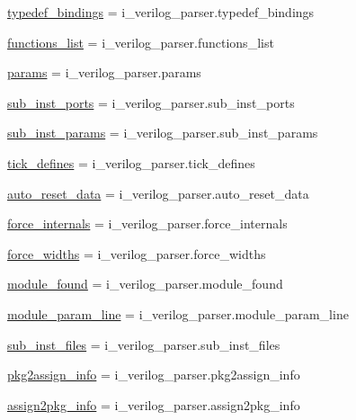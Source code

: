 \begin{DoxyCompactItemize}
\item 
\hyperlink{namespaceveripy_a680f37dc5088c673d909d0871aa4d9a1}{typedef\-\_\-bindings} = i\-\_\-verilog\-\_\-parser.\-typedef\-\_\-bindings
\item 
\hyperlink{namespaceveripy_a2c9a3299c6e29cd2d14411235ab6e41c}{functions\-\_\-list} = i\-\_\-verilog\-\_\-parser.\-functions\-\_\-list
\item 
\hyperlink{namespaceveripy_ab652869357ad8a97cd180a20659d3647}{params} = i\-\_\-verilog\-\_\-parser.\-params
\item 
\hyperlink{namespaceveripy_a2b7f6e748a1166c9272af6cc49f384bb}{sub\-\_\-inst\-\_\-ports} = i\-\_\-verilog\-\_\-parser.\-sub\-\_\-inst\-\_\-ports
\item 
\hyperlink{namespaceveripy_a3d4e4d7b77fb2b4b84c418a101755e7c}{sub\-\_\-inst\-\_\-params} = i\-\_\-verilog\-\_\-parser.\-sub\-\_\-inst\-\_\-params
\item 
\hyperlink{namespaceveripy_aaa9e0a3d2b05e047d295ee78848b3a89}{tick\-\_\-defines} = i\-\_\-verilog\-\_\-parser.\-tick\-\_\-defines
\item 
\hyperlink{namespaceveripy_aed29c63170d881d76a0845d94c3d6bdd}{auto\-\_\-reset\-\_\-data} = i\-\_\-verilog\-\_\-parser.\-auto\-\_\-reset\-\_\-data
\item 
\hyperlink{namespaceveripy_aa1d344d5e238d367dcaf3acb91dbcc6d}{force\-\_\-internals} = i\-\_\-verilog\-\_\-parser.\-force\-\_\-internals
\item 
\hyperlink{namespaceveripy_a807b041df84d51d3d521d3bef8fd0caa}{force\-\_\-widths} = i\-\_\-verilog\-\_\-parser.\-force\-\_\-widths
\item 
\hyperlink{namespaceveripy_a99c42ac13d96eb9d80f354e2a1e05c56}{module\-\_\-found} = i\-\_\-verilog\-\_\-parser.\-module\-\_\-found
\item 
\hyperlink{namespaceveripy_ad28afa9505ad0efeb718337fc56e525b}{module\-\_\-param\-\_\-line} = i\-\_\-verilog\-\_\-parser.\-module\-\_\-param\-\_\-line
\item 
\hyperlink{namespaceveripy_a0adf40cf6c1ebe154b70e8dc46889228}{sub\-\_\-inst\-\_\-files} = i\-\_\-verilog\-\_\-parser.\-sub\-\_\-inst\-\_\-files
\item 
\hyperlink{namespaceveripy_abb8af7474ba6f1fe4499f0baf5e6c9da}{pkg2assign\-\_\-info} = i\-\_\-verilog\-\_\-parser.\-pkg2assign\-\_\-info
\item 
\hyperlink{namespaceveripy_a95394440df7568c06df836060d2c1f5e}{assign2pkg\-\_\-info} = i\-\_\-verilog\-\_\-parser.\-assign2pkg\-\_\-info
\item 

\end{DoxyCompactItemize}
